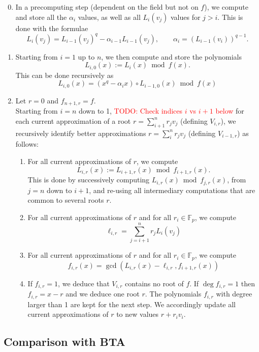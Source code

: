 \documentclass{sig-alternate}
\newcommand{\todo}[1]{\textcolor{red}{TODO: #1}}
\begin{document}
\begin{enumerate}
\setcounter{enumi}{-1}
\item In a precomputing step (dependent on the field but not on $f$), we compute and store all the $\alpha_i$ values, as well as all $L_i(v_{j})$ values for $j>i$. This is done with the formulae  
$$L_i(v_j)=L_{i-1}(v_j)^q-\alpha_{i-1}L_{i-1}(v_j), \qquad \alpha_i=(L_{i-1}(v_i))^{q-1}.$$
\item Starting from $i=1$ up to $n$, we then compute and store the polynomials
$$L_{i,0}(x):=L_i(x)\bmod f(x).$$
This can be done recursively as
$$L_{i,0}(x)=(x^q-\alpha_ix)\circ L_{i-1,0}(x)\bmod f(x)$$
\item 	Let $r=0$ and $f_{n+1,r}=f$. \\
Starting from $i=n$ down to 1, \todo{Check indices $i$ vs $i+1$ below} for each current approximation of a root $r=\sum_{i+1}^nr_jv_j$ (defining $V_{i,r}$), we recursively identify better approximations $r=\sum_{i}^nr_jv_j$ (defining $V_{i-1,r}$) as follows:
	\begin{enumerate}
	\item For all current approximations of $r$, we compute 
	$$L_{i,r}(x):=L_{i+1,r}(x)\bmod f_{i+1,r}(x).$$
	This is done by successively computing $L_{i,r}(x)\bmod f_{j,r}(x)$, from $j=n$ down to $i+1$, and re-using all intermediary computations that are common to several roots $r$.

	\item For all current approximations of $r$ and for all $r_i\in\mathbb{F}_p$, we compute 
	$$\ell_{i,r}=\sum_{j=i+1}^nr_jL_i(v_j)$$

	\item For all current approximations of $r$ and for all $r_i\in\mathbb{F}_p$, we compute 
	$$f_{i,r}(x)=\gcd(L_{i,r}(x)-\ell_{i,r},f_{i+1,r}(x))$$
	
	\item If $f_{i,r}=1$, we deduce that $V_{i,r}$ contains no root of $f$. If $\deg f_{i,r}=1$ then $f_{i,r}=x-r$ and we deduce one root $r$. The polynomials $f_{i,r}$ with degree larger than 1 are kept for the next step. We accordingly update all current approximations of $r$ to new values $r+r_iv_i$.

	\end{enumerate}

\end{enumerate}



\subsection{Comparison with BTA}
\end{document}
